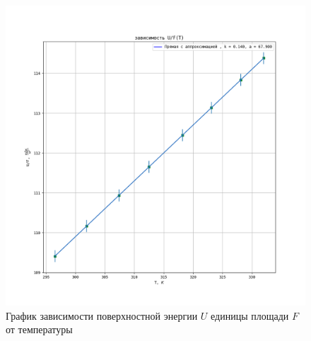 \documentclass[a4paper, 12pt]{article}
\begin{document}
\newpage


\begin{figure} [h!]
	\centering 
	\includegraphics[scale=0.57]{img/uf(t).png} 
	\caption{График зависимости поверхностной энергии $U$ единицы площади $F$ от температуры} 
\end{figure}
\end{document}
